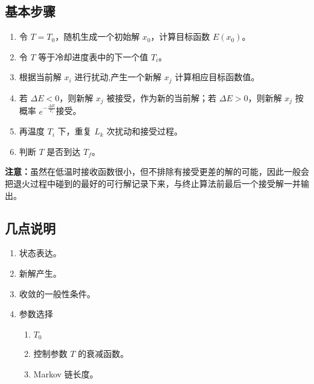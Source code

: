 \documentclass[12pt,a4paper]{article}
\begin{document}
\subsection{基本步骤}
\begin{enumerate}
  \item 令 $T = T_0$，随机生成一个初始解 $x_0$，计算目标函数 $E(x_0)$。
  \item 令 $T$ 等于冷却进度表中的下一个值 $T_i$。
  \item 根据当前解 $x_i$ 进行扰动,产生一个新解 $x_j$ 计算相应目标函数值。
  \item 若 $\Delta E<0$，则新解 $x_j$ 被接受，作为新的当前解；若 $\Delta E>0 $，则新解 $x_j$ 按概率 $e^{-\frac{\Delta E}{T_i}}$接受。
  \item 再温度 $T_i$ 下，重复 $L_k$ 次扰动和接受过程。
  \item 判断 $T$ 是否到达 $T_f$。
\end{enumerate}
 \textbf{注意：}虽然在低温时接收函数很小，但不排除有接受更差的解的可能，因此一般会把退火过程中碰到的最好的可行解记录下来，与终止算法前最后一个接受解一并输出。
\subsection{几点说明}
\begin{enumerate}
  \item 状态表达。
  \item 新解产生。
  \item 收敛的一般性条件。
  \item 参数选择
  \begin{enumerate}
    \item $T_0$
    \item 控制参数 $T$ 的衰减函数。
    \item Markov 链长度。
  \end{enumerate}
\end{enumerate}
\end{document}
